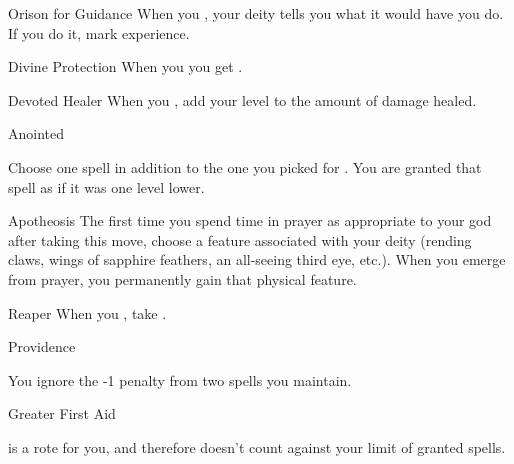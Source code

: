 \documentclass[8pt]{extarticle}
\begin{document}
\begin{multicols}{2}
\begin{amove}{Orison for Guidance}
  When you , your deity tells you what it would have you
  do. If you do it, mark experience.
\end{amove}

\begin{amove}{Divine Protection}
  When you  you get .
\end{amove}

\begin{amove}{Devoted Healer}
  When you , add your level to
  the amount of damage healed.
\end{amove}


\vfill\null
\columnbreak

\secondAdvances

\begin{amove}{Anointed}

  Choose one spell in addition to the one you picked for . You are granted that spell as if it was one level lower.
\end{amove}

\begin{amove}{Apotheosis}
  The first time you spend time in prayer as appropriate to your god
  after taking this move, choose a feature associated with your deity
  (rending claws, wings of sapphire feathers, an all-seeing third eye,
  etc.). When you emerge from prayer, you permanently gain that
  physical feature.
\end{amove}

\begin{amove}{Reaper}
  When you , take .
\end{amove}

\begin{amove}{Providence}

  You ignore the -1 penalty from two spells you maintain.
\end{amove}

\begin{amove}{Greater First Aid}

   is a rote for you, and therefore
  doesn’t count against your limit of granted spells.
\end{amove}


\end{multicols}
\end{document}

